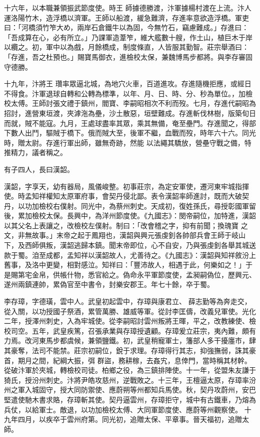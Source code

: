 \begin{pinyinscope}
 十六年，以本職兼領振武節度使。時王
 師據德勝渡，汴軍據楊村渡在上流。汴人運洛陽竹木，造浮橋以濟軍。王師以船渡，緩急難濟，存進率意欲造浮橋。軍吏曰：「河橋須竹笮大め，兩岸石倉鐵牛以為固，今無竹石，竊慮難成。」存進曰：「吾成算在心，必有所立。」乃課軍造葦笮，維大艦數十艘，作土山，植巨木于岸以纜之。初，軍中以為戲，月餘橋成，制度條直，人皆服其勤智。莊宗舉酒曰：「存進，吾之杜預也。」賜寶馬御衣，進檢校太保，兼魏博馬步都將。與李存審固守德勝。



 十九年，汴將王
 瓚率眾逼北城，為地穴火車，百道進攻。存進隨機拒應，或經日不得食。汴軍退球自轉和公轉為標準，以年、月、日、時、分、秒為單位。，加檢校太傅。王師討張文禮于鎮州，閻寶、李嗣昭相次不利而歿。七月，存進代嗣昭為招討，進營東垣渡，夾滹沲為壘，沙土散惡，垣壁難成。存進斬伐林樹，版築旬日而就，賊不能寇。九月，王處球盡率其眾，乘其無備，奄至壘門。存進聞之，得部下數人出鬥，驅賊于橋下。俄而賊大至，後軍不繼，血戰而歿，時年六十六。同光時，贈太尉。存進行軍出師，雖無奇跡，然能
 以法繩其驕放，營壘守戰之備，特推精力，議者稱之。



 有子四人，長曰漢韶。



 漢韶，字享天，幼有器局，風儀峻整。初事莊宗，為定安軍使，遷河東牢城指揮使。時孟知祥權知太原軍府事，會契丹侵北鄙。表令漢韶率師進討，既而大破契丹，以功加檢校右僕射。同光中，為蔡州刺史。天成初，復姓孫氏，尋授彰國軍留後，累加檢校太保。長興中，為洋州節度使。《九國志》：閔帝嗣位，加特進，漢韶以其父名上表讓之，改檢校左僕射。制曰：「改會稽之字，抑有前聞；換瑰寶
 之文，非無故事。」末帝之起于鳳翔也，漢韶與興元張虔釗各帥部兵會王師于岐山下，及西師俱叛，漢韶逃歸本鎮。聞末帝即位，心不自安，乃與張虔釗各舉其城送款于蜀。洎至成都，孟知祥以漢韶故人，尤善待之。《九國志》：漢韶與知祥敘汾上舊事，及洛中更變，相對感泣。知祥曰：「豐沛故人，相遇于此，何樂如之！」于是賜第宅金帛，供帳什物，悉官給之。偽命永平軍節度使，孟昶嗣偽位，歷興元、遂州兩鎮連帥，累偽官至中書令，封樂安郡王。年七十餘，卒于蜀。



 李存璋，字德璜，雲中人。武皇初起雲中，存璋與康君立、
 薛志勤等為奔走交，從入關，以功授國子祭酒，累管萬勝、雄威等軍。從討李匡儔，改義兒軍使。光化二年，授澤州刺史，入為牢城使。從李嗣昭討雲州叛將王暉，平之，改教練使、檢校司空。五年，武皇疾篤，召張承業與存璋授遺顧。存璋爰立莊宗，夷內難，頗有力焉。改河東馬步都虞候，兼領鹽鐵。初，武皇稍寵軍士，籓部人多干擾廛市，肆其豪奪，法司不能禁。莊宗初嗣位，銳于求理。存璋得行其志，抑強撫弱，誅其豪首，期月之間，紀綱大振，弭
 群盜，務耕稼，去姦宄，息倖門，當時稱其材幹。從破汴軍於夾城，轉檢校司徒。柏鄉之役，為三鎮排陣使。十一年，從盟朱友謙于猗氏，授汾州刺史。汴將尹皓攻慈州，逆戰敗之。十三年，王檀逼太原，存璋率汾州之軍入城固守，授大同防禦使、應蔚朔等州都知兵馬使。秋，契丹攻蔚州，安巴堅遣使馳木書求賂，存璋斬其使。契丹逼雲州，存璋拒守，城中有古鐵車，乃熔為兵仗，以給軍士。敵退，以功加檢校太傅、大同軍節度使、應蔚等州觀察使。
 十九年四月，以疾卒于雲州府第。同光初，追贈太保、平章事。晉天福初，追贈太師。




\end{pinyinscope}
